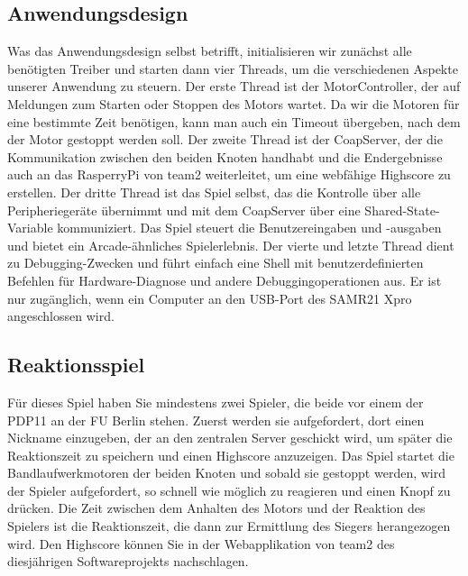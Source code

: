 \documentclass[a4paper]{article}
\begin{document}
  \subsection{Anwendungsdesign}
    \label{sec:retro11_design}
    Was das Anwendungsdesign selbst betrifft, initialisieren wir zunächst alle
    benötigten Treiber und starten dann vier Threads, um die verschiedenen Aspekte
    unserer Anwendung zu steuern. Der erste Thread ist der MotorController, der auf
    Meldungen zum Starten oder Stoppen des Motors wartet. Da wir die Motoren für
    eine bestimmte Zeit benötigen, kann man auch ein Timeout übergeben, nach dem
    der Motor gestoppt werden soll. Der zweite Thread ist der CoapServer, der die
    Kommunikation zwischen den beiden Knoten handhabt und die Endergebnisse auch
    an das RasperryPi von team2 weiterleitet, um eine webfähige Highscore zu
    erstellen. Der dritte Thread ist das Spiel selbst, das die Kontrolle über alle
    Peripheriegeräte übernimmt und mit dem CoapServer über eine
    Shared-State-Variable kommuniziert. Das Spiel steuert die Benutzereingaben und
    -ausgaben und bietet ein Arcade-ähnliches Spielerlebnis. Der vierte und letzte
    Thread dient zu Debugging-Zwecken und führt einfach eine Shell mit
    benutzerdefinierten Befehlen für Hardware-Diagnose und andere
    Debuggingoperationen aus. Er ist nur zugänglich, wenn ein Computer an den
    USB-Port des SAMR21 Xpro angeschlossen wird.\\

  \subsection{Reaktionsspiel}
    \label{sec:retro11_game}
    Für dieses Spiel haben Sie mindestens zwei Spieler, die beide vor einem der
    PDP11 an der FU Berlin stehen. Zuerst werden sie aufgefordert, dort einen
    Nickname einzugeben, der an den zentralen Server geschickt wird, um später die
    Reaktionszeit zu speichern und einen Highscore anzuzeigen. Das Spiel startet
    die Bandlaufwerkmotoren der beiden Knoten und sobald sie gestoppt werden, wird
    der Spieler aufgefordert, so schnell wie möglich zu reagieren und einen Knopf
    zu drücken. Die Zeit zwischen dem Anhalten des Motors und der Reaktion des
    Spielers ist die Reaktionszeit, die dann zur Ermittlung des Siegers
    herangezogen wird. Den Highscore können Sie in der Webapplikation von team2 des
    diesjährigen Softwareprojekts nachschlagen.\\
\end{document}
